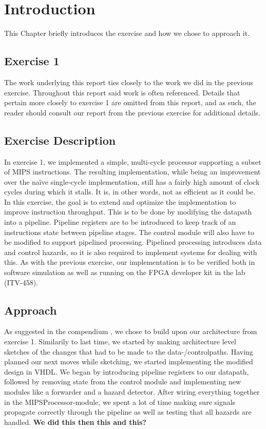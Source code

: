 \chapter{Introduction}
This Chapter briefly introduces the exercise and how we chose to approach it.

\section{Exercise 1}

The work underlying this report ties closely to the work we did in the previous exercise.
Throughout this report said work is often referenced.
Details that pertain more closely to exercise 1 are omitted from this report, and as such, the reader should consult our report from the previous exercise \cite{ex1report} for additional details.

\section{Exercise Description}

In exercise 1, we implemented a simple, multi-cycle processor supporting a subset of MIPS instructions.
The resulting implementation, while being an improvement over the naïve single-cycle implementation, still has a fairly high amount of clock cycles during which it stalls.
It is, in other words, not as efficient as it could be.
In this exercise, the goal is to extend and optimize the implementation to improve instruction throughput.
This is to be done by modifying the datapath into a pipeline.
Pipeline registers are to be introduced to keep track of an instructions state between pipeline stages.
The control module will also have to be modified to support pipelined processing.
Pipelined processing introduces data and control hazards, so it is also required to implement systems for dealing with this.
As with the previous exercise, our implementation is to be verified both in software simulation as well as running on the FPGA developer kit in the lab (ITV-458).


\section{Approach}

As suggested in the compendium \cite{compendium}, we chose to build upon our architecture from exercise 1.
Similarily to last time, we started by making architecture level sketches of the changes that had to be made to the data-/controlpaths.
Having planned our next moves while sketching, we started implementing the modified design in VHDL.
We began by introducing pipeline registers to our datapath, followed by removing state from the control module and implementing new modules like a forwarder and a hazard detector.
After wiring everything together in the MIPSProcessor-module, we spent a lot of time making sure signals propagate correctly through the pipeline as well as testing that all hazards are handled. \textbf{We did this then this and this?}

